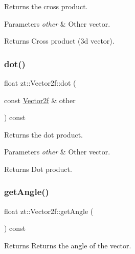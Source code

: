 Returns the cross product. 


\begin{DoxyParams}{Parameters}
{\em other} & Other vector. \\
\hline
\end{DoxyParams}
\begin{DoxyReturn}{Returns}
Cross product (3d vector). 
\end{DoxyReturn}
\mbox{\label{classzt_1_1_vector2f_a8141042fa92a5138e5d435505882d122}} 
\subsubsection{\texorpdfstring{dot()}{dot()}}
{\footnotesize\ttfamily float zt\+::\+Vector2f\+::dot (\begin{DoxyParamCaption}\item[{const \hyperlink{classzt_1_1_vector2f}{Vector2f} \&}]{other }\end{DoxyParamCaption}) const}



Returns the dot product. 


\begin{DoxyParams}{Parameters}
{\em other} & Other vector. \\
\hline
\end{DoxyParams}
\begin{DoxyReturn}{Returns}
Dot product. 
\end{DoxyReturn}
\mbox{\label{classzt_1_1_vector2f_a4449e55fef14e503d832831b97d2f949}} 
\subsubsection{\texorpdfstring{get\+Angle()}{getAngle()}}
{\footnotesize\ttfamily float zt\+::\+Vector2f\+::get\+Angle (\begin{DoxyParamCaption}{ }\end{DoxyParamCaption}) const}

\begin{DoxyReturn}{Returns}
Returns the angle of the vector. 
\end{DoxyReturn}
\mbox{\label{classzt_1_1_vector2f_a69478760accc84d5de3867c899499f3a}} 
